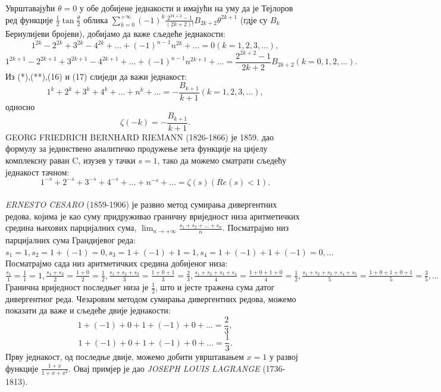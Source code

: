 \documentclass[12pt]{article}
\begin{document}
Уврштавајући $\theta=0$ у обе добијене једнакости и имајући на уму да је Тејлоров ред функције $\frac{1}{2}\tan\frac{\theta}{2}$ облика $\sum_{k=0}^{+\infty}(-1)^k\frac{2^{2k+2}-1}{(2k+2)!}B_{2k+2}\theta^{2k+1}$ (гдје су $B_k$ Бернулијеви бројеви),  добијамо да важе сљедеће једнакости: \begin{equation}
1^{2k}-2^{2k}+3^{2k}-4^{2k}+...+(-1)^{n-1}n^{2k}+...=0(k=1,2,3,...),
\end{equation} \begin{equation}
1^{2k+1}-2^{2k+1}+3^{2k+1}-4^{2k+1}+...+(-1)^{n-1}n^{2k+1}+...=\frac{2^{2k+2}-1}{2k+2}B_{2k+2}(k=0,1,2,...).
\end{equation} Из (*),(**),(16) и (17) слиједи да важи једнакост: \begin{equation}
1^k+2^k+3^k+4^k+...+n^k+...=-\frac{B_{k+1}}{k+1}(k=1,2,3,...),
\end{equation} односно $$\zeta(-k)=-\frac{B_{k+1}}{k+1}.$$ GEORG FRIEDRICH BERNHARD RIEMANN (1826-1866) је 1859. дао формулу за јединствено аналитичко продужење зета функције на цијелу комплексну раван {\boldmath C}, изузев у тачки $s=1$, тако да можемо сматрати сљедећу једнакост тачном: \begin{equation}
1^{-s}+2^{-s}+3^{-s}+4^{-s}+...+n^{-s}+...=\zeta(s)(Re(s)<1).
\end{equation}
\\
{\it ERNESTO CESARO} (1859-1906) је развио метод сумирања дивергентних редова, којима је као суму придруживао граничну вриједност низа аритметичких средина њихових парцијалних сума, $\lim_{n\to+\infty}\frac{s_1+s_2+...+s_n}{n}$. Посматрајмо низ парцијалних сума Грандијевог реда: $s_1=1, s_2=1+(-1)=0, s_3=1+(-1)+1=1, s_4=1+(-1)+1+(-1)=0, ...$ Посматрајмо сада низ аритметичких средина добијеног низа: $\frac{s_1}{1}=\frac{1}{1}=1, \frac{s_1+s_2}{2}=\frac{1+0}{2}=\frac{1}{2}, \frac{s_1+s_2+s_3}{3}=\frac{1+0+1}{3}=\frac{2}{3},\frac{s_1+s_2+s_3+s_4}{4}=\frac{1+0+1+0}{4}=\frac{1}{2}, \frac{s_1+s_2+s_3+s_4+s_5}{5}=\frac{1+0+1+0+1}{5}=\frac{3}{5}, ...$ Гранична вриједност последњег низа је $\frac{1}{2}$, што и јесте тражена сума датог дивергентног реда. Чезаровим методом сумирања дивергентних редова, можемо показати да важе и сљедеће двије једнакости: \begin{equation}
1+(-1)+0+1+(-1)+0+...=\frac{2}{3}, 
\end{equation} 
\begin{equation}
1+(-1)+0+1+(-1)+0+...=\frac{1}{3}.
\end{equation} Прву једнакост, од последње двије, можемо добити уврштавањем $x=1$ у развој функције $\frac{1+x}{1+x+x^2}$. Овај примјер је дао {\it JOSEPH LOUIS LAGRANGE} (1736-1813). \\
\end{document}
